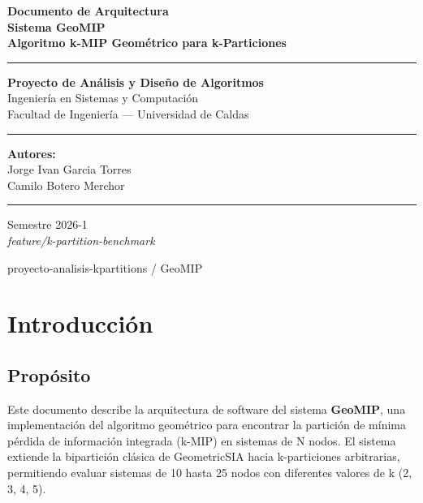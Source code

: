 \documentclass[12pt,a4paper]{article}
\begin{document}
\begin{titlepage}
    \centering
    \vspace*{1cm}
    {\Huge\bfseries\color{primary} Documento de Arquitectura\\[0.5em]
    \Large Sistema GeoMIP\\[0.3em]
    \large Algoritmo k-MIP Geométrico para k-Particiones}
    \vspace{1.5cm}

    \rule{\linewidth}{2pt}
    \vspace{0.5cm}

    {\large\textbf{Proyecto de Análisis y Diseño de Algoritmos}}\\[0.3em]
    {\large Ingeniería en Sistemas y Computación}\\[0.3em]
    {\large Facultad de Ingeniería — Universidad de Caldas}
    \vspace{1cm}

    \rule{\linewidth}{0.5pt}
    \vspace{0.8cm}

    {\large\textbf{Autores:}}\\[0.5em]
    {\large Jorge Ivan Garcia Torres}\\[0.3em]
    {\large Camilo Botero Merchor}
    \vspace{1cm}

    \rule{\linewidth}{0.5pt}
    \vspace{0.5cm}
    {\large Semestre 2026-1}\\[0.2em]
    {\large\textit{feature/k-partition-benchmark}}

    \vfill
    {\small\color{gray} proyecto-analisis-kpartitions / GeoMIP}
\end{titlepage}

\tableofcontents
\newpage

\section{Introducción}

\subsection{Propósito}
Este documento describe la arquitectura de software del sistema \textbf{GeoMIP}, una implementación del algoritmo geométrico para encontrar la partición de mínima pérdida de información integrada (k-MIP) en sistemas de N nodos. El sistema extiende la bipartición clásica de GeometricSIA hacia k-particiones arbitrarias, permitiendo evaluar sistemas de 10 hasta 25 nodos con diferentes valores de k (2, 3, 4, 5).
\end{document}

